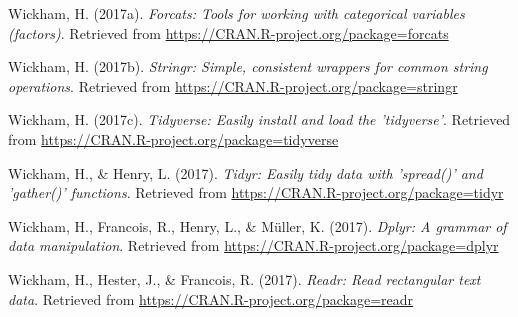 \documentclass[english,floatsintext,man]{apa6}
\theoremstyle{definition}
\theoremstyle{definition}
\theoremstyle{definition}
\theoremstyle{remark}
\begin{document}
\leavevmode\hypertarget{ref-R-forcats}{}%
Wickham, H. (2017a). \emph{Forcats: Tools for working with categorical
variables (factors)}. Retrieved from
\url{https://CRAN.R-project.org/package=forcats}

\leavevmode\hypertarget{ref-R-stringr}{}%
Wickham, H. (2017b). \emph{Stringr: Simple, consistent wrappers for
common string operations}. Retrieved from
\url{https://CRAN.R-project.org/package=stringr}

\leavevmode\hypertarget{ref-R-tidyverse}{}%
Wickham, H. (2017c). \emph{Tidyverse: Easily install and load the
'tidyverse'}. Retrieved from
\url{https://CRAN.R-project.org/package=tidyverse}

\leavevmode\hypertarget{ref-R-tidyr}{}%
Wickham, H., \& Henry, L. (2017). \emph{Tidyr: Easily tidy data with
'spread()' and 'gather()' functions}. Retrieved from
\url{https://CRAN.R-project.org/package=tidyr}

\leavevmode\hypertarget{ref-R-dplyr}{}%
Wickham, H., Francois, R., Henry, L., \& Müller, K. (2017). \emph{Dplyr:
A grammar of data manipulation}. Retrieved from
\url{https://CRAN.R-project.org/package=dplyr}

\leavevmode\hypertarget{ref-R-readr}{}%
Wickham, H., Hester, J., \& Francois, R. (2017). \emph{Readr: Read
rectangular text data}. Retrieved from
\url{https://CRAN.R-project.org/package=readr}
\end{document}
